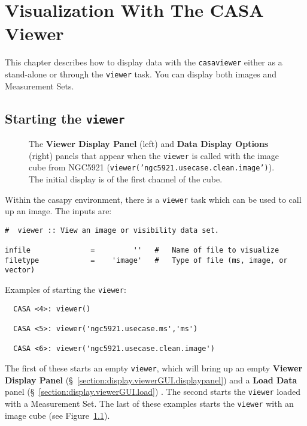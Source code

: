 

\chapter{Visualization With The CASA Viewer}
\label{chapter:display}

This chapter describes how to display data with the {\tt casaviewer}
either as a stand-alone or through the {\tt viewer} task. You can
display both images and Measurement Sets.

\section{Starting the {\tt viewer}}
\label{section:display.start}

\begin{figure}[h!]
\caption{\label{fig:viewer_start} The {\bf Viewer Display Panel} (left) and 
{\bf Data Display Options} (right) panels that appear when the 
{\tt viewer} is called with the image cube from NGC5921
({\tt viewer('ngc5921.usecase.clean.image')}).  The initial display is
of the first channel of the cube.}
\hrulefill
\end{figure}

Within the casapy environment, there is a {\tt viewer} task
which can be used to call up an image.  The inputs are:
\small
\begin{verbatim}
#  viewer :: View an image or visibility data set.

infile              =         ''   #   Name of file to visualize
filetype            =    'image'   #   Type of file (ms, image, or vector)
\end{verbatim}
\normalsize

Examples of starting the {\tt viewer}:
\small
\begin{verbatim}
  CASA <4>: viewer()

  CASA <5>: viewer('ngc5921.usecase.ms','ms')

  CASA <6>: viewer('ngc5921.usecase.clean.image')
\end{verbatim}
\normalsize
The first of these starts an empty {\tt viewer}, which will bring up
an empty {\bf Viewer Display Panel} 
(\S~\ref{section:display.viewerGUI.displaypanel}) and a {\bf Load Data} panel 
(\S~\ref{section:display.viewerGUI.load}) .  The second starts the
{\tt viewer} loaded with a Measurement Set.  The last of these examples
starts the {\tt viewer} with an image cube 
(see Figure~\ref{fig:viewer_start}).

